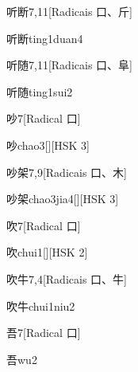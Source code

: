 \begin{entry}{听断}{7,11}[Radicais ⼝、⽄]
  \begin{phonetics}{听断}{ting1duan4}
  \end{phonetics}
\end{entry}

\begin{entry}{听随}{7,11}[Radicais ⼝、⾩]
  \begin{phonetics}{听随}{ting1sui2}
  \end{phonetics}
\end{entry}

\begin{entry}{吵}{7}[Radical ⼝]
  \begin{phonetics}{吵}{chao3}[][HSK 3]
  \end{phonetics}
\end{entry}

\begin{entry}{吵架}{7,9}[Radicais ⼝、⽊]
  \begin{phonetics}{吵架}{chao3jia4}[][HSK 3]
  \end{phonetics}
\end{entry}

\begin{entry}{吹}{7}[Radical ⼝]
  \begin{phonetics}{吹}{chui1}[][HSK 2]
  \end{phonetics}
\end{entry}

\begin{entry}{吹牛}{7,4}[Radicais ⼝、⽜]
  \begin{phonetics}{吹牛}{chui1niu2}
  \end{phonetics}
\end{entry}

\begin{entry}{吾}{7}[Radical ⼝]
  \begin{phonetics}{吾}{wu2}
  \end{phonetics}
\end{entry}

